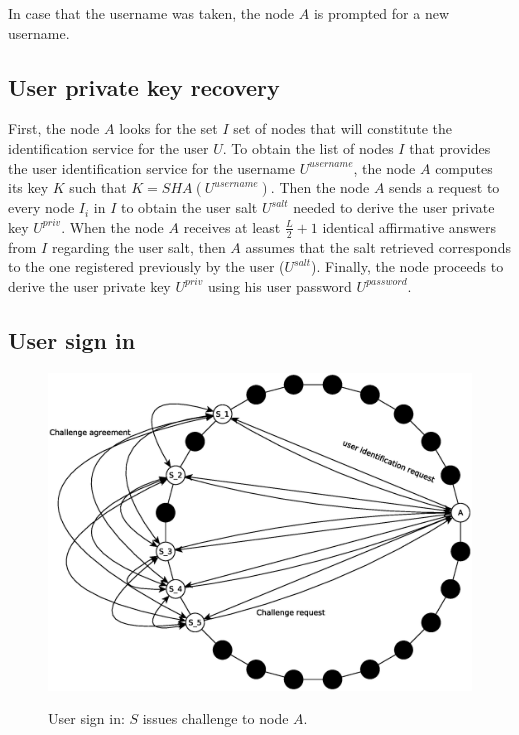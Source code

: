 In case that the username was taken,
the node $A$ is prompted for a new username.



\subsection{User private key recovery}
\label{sec:private_key_recovery}

First, the node $A$ looks for the set $I$ set of nodes that will constitute the
identification service for the user $U$.
To obtain the list of nodes $I$ that provides the user identification service for
the username $U^{username}$, the node $A$ computes its key $K$ such that $K =
SHA(U^{username})$. 
Then the node $A$ sends a request to every node $I_i$ in $I$ to obtain the user
salt $U^{salt}$ needed to derive the user private key $U^{priv}$.
 When the node $A$ receives at least $\frac{L}{2} + 1$ identical affirmative answers from
$I$ regarding the user salt, then $A$ assumes that the salt retrieved
corresponds to the one registered previously by the user ($U^{salt}$). Finally,
the node proceeds to derive the user private key $U^{priv}$ using his user password $U^{password}$.

\subsection{User sign in}
\begin{figure}[!htb]
\centering
\includegraphics[width=14cm]{../img/sign_in}\\
\caption{User sign in: $S$ issues challenge to node $A$.}
\label{fig:sign_in}
\end{figure}

